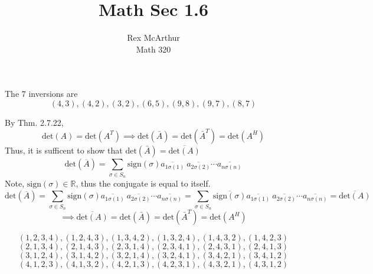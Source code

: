 \documentclass[letterpaper,12pt]{article}
\title{Math Sec 1.6}
\author{Rex McArthur\\Math 320}
\theoremstyle{definition}
\begin{document}
\maketitle
{}
The 7 inversions are
\[ (4,3), (4,2),(3,2),(6,5),(9,8),(9,7),(8,7)\]

By Thm. 2.7.22, 
\[ \text{det} (A) = \text{det} (A^T) \implies \text{det}(\bar A) = \text{det} (\bar A^T) = \text{det} (A^H)\]
Thus, it is sufficent to show that $\text{det} (\bar A) = \overline{\text{det} (A)}$
\[\text{det}(\overline{A}) = \sum^{}_{\sigma \in S_n} \text{sign} (\sigma) \overline{a_{1 \sigma(1)}}~\overline{a_{2 \sigma(2)}}\cdots\overline{a_{n \sigma(n)}}\]
Note, $\text{sign} (\sigma) \in \mathbb{R}$, thus the conjugate is equal to itself.
\[\text{det}(\overline{A}) = \sum^{}_{\sigma \in S_n} \text{sign} (\sigma) \overline{a_{1 \sigma(1)}}~\overline{a_{2 \sigma(2)}}\cdots\overline{a_{n \sigma(n)}} =
\sum^{}_{\sigma \in S_n} \overline{\text{sign} (\sigma) }\overline{a_{1 \sigma(1)}}~\overline{a_{2 \sigma(2)}}\cdots\overline{a_{n \sigma(n)}} = \overline{\text{det}(A)}\]
\[\implies\overline{\text{det}(A)}= \text{det}(\bar A) = \text{det} (\bar A^T) = \text{det} (A^H)\]

\[ (1,2,3,4),(1,2,4,3),(1,3,4,2),(1,3,2,4),(1,4,3,2),(1,4,2,3)\]
\[ (2,1,3,4),(2,1,4,3),(2,3,1,4),(2,3,4,1),(2,4,3,1),(2,4,1,3)\]
\[ (3,1,2,4),(3,1,4,2),(3,2,1,4),(3,2,4,1),(3,4,2,1),(3,4,1,2)\]
\[ (4,1,2,3),(4,1,3,2),(4,2,1,3),(4,2,3,1),(4,3,2,1),(4,3,1,2)\]
\end{document}
